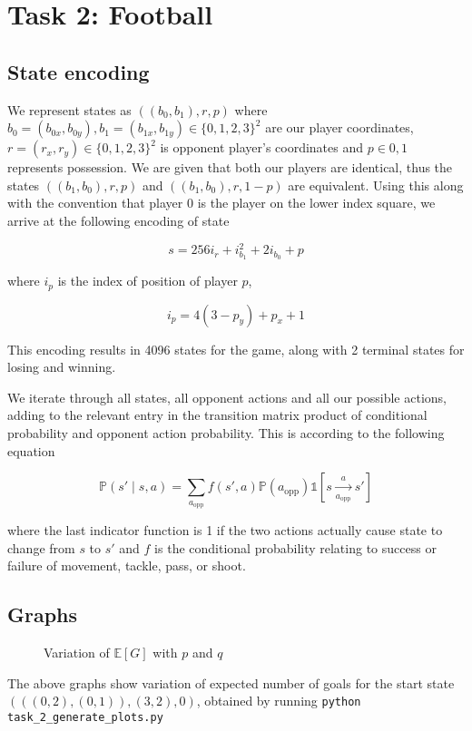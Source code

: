 \section*{Task 2: Football}
\subsection*{State encoding}
We represent states as $((b_0, b_1), r, p)$ where $b_0 = (b_{0x}, b_{0y}), b_1 = (b_{1x}, b_{1y})\in\{0,1,2,3\}^2$ are our player coordinates, $r = (r_x, r_y)\in\{0,1,2,3\}^2$ is opponent player's coordinates and $p\in{0,1}$ represents possession.
We are given that both our players are identical, thus the states $((b_1, b_0), r, p)$ and $((b_1, b_0), r, 1 - p)$ are equivalent. Using this along with the convention that player 0 is the player on the lower index square, we arrive at the following encoding of state

$$s = 256i_r + i_{b_1}^2 + 2i_{b_0} + p$$

where $i_p$ is the index of position of player $p$,

$$i_p = 4(3-p_y) + p_x + 1$$

This encoding results in 4096 states for the game, along with 2 terminal states for losing and winning.

We iterate through all states, all opponent actions and all our possible actions, adding to the relevant entry in the transition matrix product of conditional probability and opponent action probability. This is according to the following equation

$$\mathbb{P}\left(s'\middle|s, a\right) = \sum\limits_{a_\text{opp}}f\left(s', a\right)\mathbb{P}(a_\text{opp})\mathds{1}\left[s\xrightarrow[a_\text{opp}]{a}s'\right]$$

where the last indicator function is 1 if the two actions actually cause state to change from $s$ to $s'$ and $f$ is the conditional probability relating to success or failure of movement, tackle, pass, or shoot.

\subsection*{Graphs}

\begin{figure}[h]
    \begin{subfigure}[b]{0.5\textwidth}
        \centering
        
    \end{subfigure}
    \begin{subfigure}[b]{0.5\textwidth}
        \centering
        
    \end{subfigure}
    \caption{Variation of $\mathbb{E}[G]$ with $p$ and $q$}
\end{figure}
The above graphs show variation of expected number of goals for the start state $(((0, 2), (0, 1)), (3, 2), 0)$, obtained by running \lstinline{python task_2_generate_plots.py}

